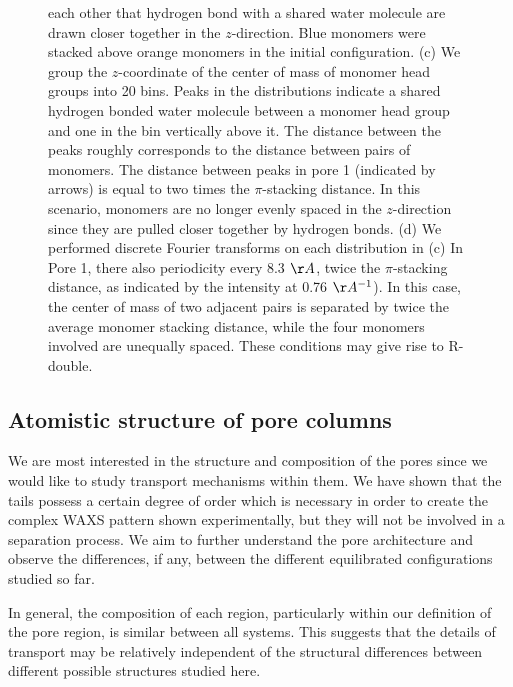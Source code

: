 \documentclass[journal=jpcbfk,manuscript=article]{achemso}
\begin{document}
\begin{figure}[!htb]
{  each other that hydrogen bond with a shared water molecule are drawn closer
  together in the $z$-direction. Blue monomers were stacked above orange monomers in the
  initial configuration. (c) We group the $z$-coordinate of the center of mass of monomer
  head groups into 20 bins. Peaks in the distributions indicate a shared hydrogen bonded
  water molecule between a monomer head group and one in the bin vertically above it. 
  The distance between the peaks roughly corresponds to the distance between pairs of 
  monomers. The distance between peaks in pore 1 (indicated by arrows) is equal to two 
  times the $\pi$-stacking distance. In this scenario, monomers are no longer evenly spaced
  in the $z$-direction since they are pulled closer together by hydrogen bonds. (d) We 
  performed discrete Fourier transforms on each distribution in (c) In Pore 1, there 
  also periodicity every 8.3 $\AA$, twice the $\pi$-stacking distance, as indicated by the
  intensity at 0.76 $\AA^{-1}$). In this case, the center of mass of two adjacent pairs 
  is separated by twice the average monomer stacking distance, while the four monomers 
  involved are unequally spaced. These conditions may give rise to R-double.}\label{fig:hbonds}
  \end{figure}
  
  \subsection{Atomistic structure of pore columns}

  We are most interested in the structure and composition of the pores since we would like to study
  transport mechanisms within them. We have shown that the tails possess a certain degree of order
  which is necessary in order to create the complex WAXS pattern shown experimentally, but
  they will not be involved in a separation process. We aim to further understand the pore
  architecture and observe the differences, if any, between the different equilibrated
  configurations studied so far.

  In general, the composition of each region, particularly within our
  definition of the pore region, is similar between all systems.  This suggests
  that the details of transport may be relatively independent of the structural
  differences between different possible structures studied here.
  
\end{document}

